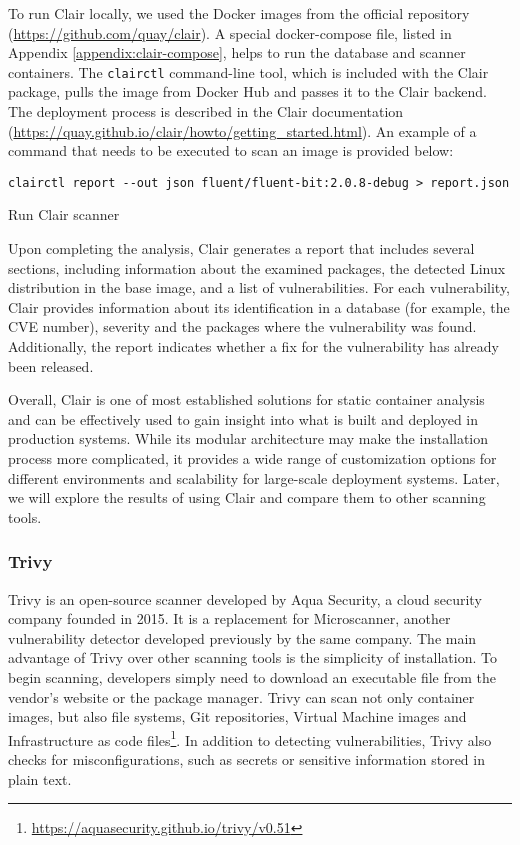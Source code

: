 To run Clair locally, we used the Docker images from the official repository (\url{https://github.com/quay/clair}). A special docker-compose file, listed in Appendix \ref{appendix:clair-compose}, helps to run the database and scanner containers. The \texttt{clairctl} command-line tool, which is included with the Clair package, pulls the image from Docker Hub and passes it to the Clair backend. The deployment process is described in the Clair documentation (\url{https://quay.github.io/clair/howto/getting_started.html}). An example of a command that needs to be executed to scan an image is provided below:

\begin{listing}[htp]
    \centering
    \begin{minipage}{0.95\linewidth}
        \begin{verbatim}
clairctl report --out json fluent/fluent-bit:2.0.8-debug > report.json
        \end{verbatim}
    \end{minipage}
    \caption{Run Clair scanner}
    \label{lst:clair}
\end{listing}

Upon completing the analysis, Clair generates a report that includes several sections, including information about the examined packages, the detected Linux distribution in the base image, and a list of vulnerabilities. For each vulnerability, Clair provides information about its identification in a database (for example, the CVE number), severity and the packages where the vulnerability was found. Additionally, the report indicates whether a fix for the vulnerability has already been released.

Overall, Clair is one of most established solutions for static container analysis and can be effectively used to gain insight into what is built and deployed in production systems. While its modular architecture may make the installation process more complicated, it provides a wide range of customization options for different environments and scalability for large-scale deployment systems. Later, we will explore the results of using Clair and compare them to other scanning tools.

\subsubsection{Trivy}

Trivy is an open-source scanner developed by Aqua Security, a cloud security company founded in 2015. It is a replacement for Microscanner, another vulnerability detector developed previously by the same company. The main advantage of Trivy over other scanning tools is the simplicity of installation. To begin scanning, developers simply need to download an executable file from the vendor's website or the package manager. Trivy can scan not only container images, but also file systems, Git repositories, Virtual Machine images and Infrastructure as code files\footnote{\url{https://aquasecurity.github.io/trivy/v0.51}}. In addition to detecting vulnerabilities, Trivy also checks for misconfigurations, such as secrets or sensitive information stored in plain text.


